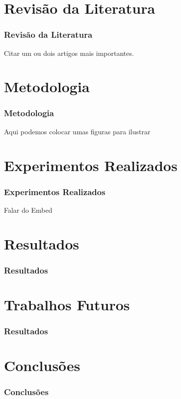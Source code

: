 \section{Revisão da Literatura}
\begin{frame}
	\frametitle{Revisão da Literatura}
	
	Citar um ou dois artigos mais importantes.
	
	
\end{frame}
\section{Metodologia}
\begin{frame}
	\frametitle{Metodologia}
	
	Aqui podemos colocar umas figuras para ilustrar	
	
	
\end{frame}
\section{Experimentos Realizados}
\begin{frame}
	\frametitle{Experimentos Realizados}
	
	Falar do Embed
	
	
	
\end{frame}
\section{Resultados}
\begin{frame}
	\frametitle{Resultados}
	
	
	
	
\end{frame}
\section{Trabalhos Futuros}
\begin{frame}
	\frametitle{Resultados}
	
	
	
	
\end{frame}
\section{Conclusões}
\begin{frame}
	\frametitle{Conclusões}
	
	
	
	
\end{frame}




















